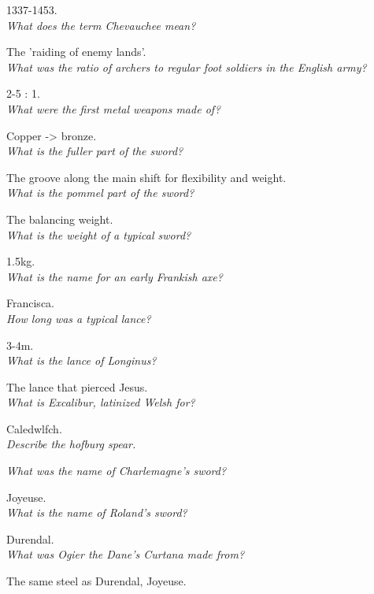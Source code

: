 \documentclass[12pt]{article}
\begin{document}
1337-1453.\\

\textit{What does the term Chevauchee mean?}

The 'raiding of enemy lands'.\\

\textit{What was the ratio of archers to regular foot soldiers in the English army?}

2-5 : 1.\\
\textit{What were the first metal weapons made of?}

Copper -> bronze.\\

\textit{What is the fuller part of the sword?}

The groove along the main shift for flexibility and weight.\\

\textit{What is the pommel part of the sword?}

The balancing weight.\\

\textit{What is the weight of a typical sword?}

1.5kg.\\

\textit{What is the name for an early Frankish axe?}

Francisca.\\

\textit{How long was a typical lance?}

3-4m.\\

\textit{What is the lance of Longinus?}

The lance that pierced Jesus.\\

\textit{What is Excalibur, latinized Welsh for?}

Caledwlfch.\\

\textit{Describe the hofburg spear.}

\textit{What was the name of Charlemagne's sword?}

Joyeuse.\\

\textit{What is the name of Roland's sword?}

Durendal.\\

\textit{What was Ogier the Dane's Curtana made from?}

The same steel as Durendal, Joyeuse.\\
\end{document}
